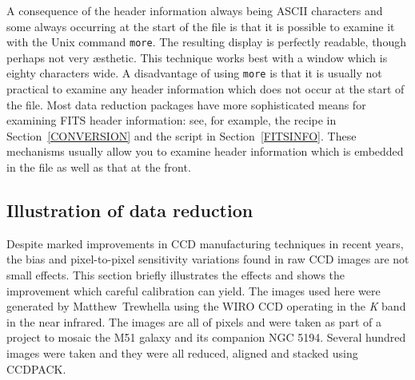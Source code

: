 \documentclass[twoside,11pt]{starlink}
\begin{document}
A consequence of the header information always being ASCII characters
and some always occurring at the start of the file is that it is possible
to examine it with the Unix command \texttt{more}.  The resulting display is
perfectly readable, though perhaps not very \ae sthetic.  This technique
works best with a window which is eighty characters wide.  A disadvantage
of using \texttt{more} is that it is usually not practical to examine any
header information which does not occur at the start of the file.  Most
data reduction packages have more sophisticated means for examining FITS
header information: see, for example, the recipe in Section~\ref{CONVERSION}
and the script in Section~\ref{FITSINFO}.  These mechanisms usually allow
you to examine header information which is embedded in the file as well
as that at the front.

\subsection{Illustration of data reduction}

Despite marked improvements in CCD manufacturing techniques in recent
years, the bias and pixel-to-pixel sensitivity variations found in raw
CCD images are not small effects.  This section briefly illustrates the
effects and shows the improvement which careful calibration can yield.
The images used here were generated by Matthew~Trewhella using the WIRO CCD
operating in the \textit{K}\/ band in the near infrared.  The images are all of
pixels and were taken as part of a project to mosaic the M51 galaxy
and its companion NGC 5194.  Several hundred images were taken and they were
all reduced, aligned and stacked using CCDPACK.
\end{document}
